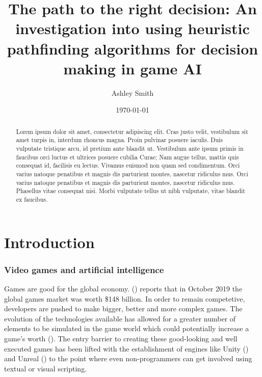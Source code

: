 \documentclass[11pt, a4paper]{article}
\begin{document}
\title{\titlefont The path to the right decision: An investigation into using heuristic pathfinding algorithms for decision making in game AI}
\author{Ashley Smith}
\date{\today}
\maketitle
\thispagestyle{empty}

\renewcommand\abstractname{\textbf{Abstract}}
\begin{abstract}
Lorem ipsum dolor sit amet, consectetur adipiscing elit. Cras justo velit, vestibulum sit amet turpis in, interdum rhoncus magna. Proin pulvinar posuere iaculis. Duis vulputate tristique arcu, id pretium ante blandit ut. Vestibulum ante ipsum primis in faucibus orci luctus et ultrices posuere cubilia Curae; Nam augue tellus, mattis quis consequat id, facilisis eu lectus. Vivamus euismod non quam sed condimentum. Orci varius natoque penatibus et magnis dis parturient montes, nascetur ridiculus mus. Orci varius natoque penatibus et magnis dis parturient montes, nascetur ridiculus mus. Phasellus vitae consequat nisi. Morbi vulputate tellus ut nibh vulputate, vitae blandit ex faucibus.
\end{abstract}

\cleardoublepage
\setcounter{page}{1}
\tableofcontents

\cleardoublepage
{}
\setcounter{page}{1}
\section{Introduction}

\subsubsection{Video games and artificial intelligence}

Games are good for the global economy. \citeauthor{Newzoo} (\citeyear{Newzoo}) reports that in October 2019 the global games market was worth \$148 billion. In order to remain competetive, developers are pushed to make bigger, better and more complex games. The evolution of the technologies available has allowed for a greater number of elements to be simulated in the game world which could potentially increase a game's worth (\cite{blow2004game}). The entry barrier to creating these good-looking and well executed games has been lifted with the establishment of engines like Unity (\cite{Unity}) and Unreal (\cite{Unreal}) to the point where even non-programmers can get involved using textual or visual scripting.
\end{document}
